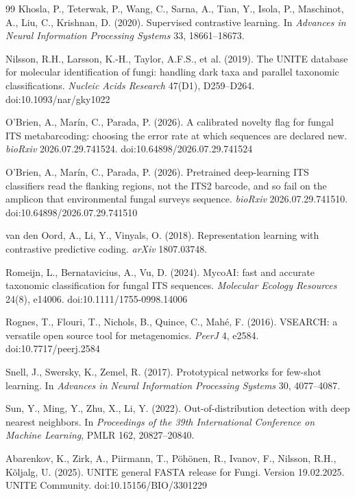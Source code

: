 \documentclass[11pt]{article}
\begin{document}
\begin{thebibliography}{99}
Khosla, P., Teterwak, P., Wang, C., Sarna, A., Tian, Y., Isola, P.,
Maschinot, A., Liu, C., Krishnan, D. (2020). Supervised contrastive learning. In
\emph{Advances in Neural Information Processing Systems} 33, 18661--18673.

Nilsson, R.H., Larsson, K.-H., Taylor, A.F.S., et al. (2019). The UNITE database
for molecular identification of fungi: handling dark taxa and parallel taxonomic
classifications. \emph{Nucleic Acids Research} 47(D1), D259--D264.
doi:10.1093/nar/gky1022

O'Brien, A., Mar\'in, C., Parada, P. (2026). A calibrated novelty flag for fungal
ITS metabarcoding: choosing the error rate at which sequences are declared new.
\emph{bioRxiv} 2026.07.29.741524. doi:10.64898/2026.07.29.741524

O'Brien, A., Mar\'in, C., Parada, P. (2026). Pretrained deep-learning ITS
classifiers read the flanking regions, not the ITS2 barcode, and so fail on the
amplicon that environmental fungal surveys sequence. \emph{bioRxiv}
2026.07.29.741510. doi:10.64898/2026.07.29.741510

van den Oord, A., Li, Y., Vinyals, O. (2018). Representation learning with
contrastive predictive coding. \emph{arXiv} 1807.03748.

Romeijn, L., Bernatavicius, A., Vu, D. (2024). MycoAI: fast and accurate
taxonomic classification for fungal ITS sequences. \emph{Molecular Ecology
Resources} 24(8), e14006. doi:10.1111/1755-0998.14006

Rognes, T., Flouri, T., Nichols, B., Quince, C., Mah\'e, F. (2016). VSEARCH: a
versatile open source tool for metagenomics. \emph{PeerJ} 4, e2584.
doi:10.7717/peerj.2584

Snell, J., Swersky, K., Zemel, R. (2017). Prototypical networks for few-shot
learning. In \emph{Advances in Neural Information Processing Systems} 30,
4077--4087.

Sun, Y., Ming, Y., Zhu, X., Li, Y. (2022). Out-of-distribution detection with
deep nearest neighbors. In \emph{Proceedings of the 39th International
Conference on Machine Learning}, PMLR 162, 20827--20840.

Abarenkov, K., Zirk, A., Piirmann, T., P\"oh\"onen, R., Ivanov, F., Nilsson,
R.H., K\~oljalg, U. (2025). UNITE general FASTA release for Fungi. Version
19.02.2025. UNITE Community. doi:10.15156/BIO/3301229


\end{thebibliography}
\end{document}
